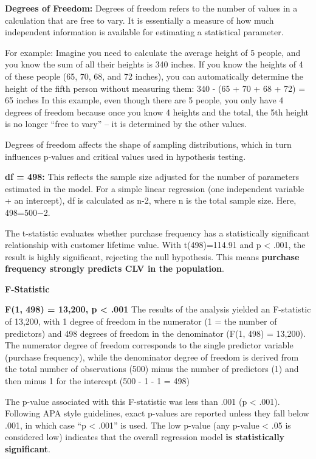 \documentclass[
]{article}
\begin{document}
\textbf{Degrees of Freedom:} Degrees of freedom refers to the number of
values in a calculation that are free to vary. It is essentially a
measure of how much independent information is available for estimating
a statistical parameter.

For example: Imagine you need to calculate the average height of 5
people, and you know the sum of all their heights is 340 inches. If you
know the heights of 4 of these people (65, 70, 68, and 72 inches), you
can automatically determine the height of the fifth person without
measuring them: 340 - (65 + 70 + 68 + 72) = 65 inches In this example,
even though there are 5 people, you only have 4 degrees of freedom
because once you know 4 heights and the total, the 5th height is no
longer ``free to vary'' -- it is determined by the other values.

Degrees of freedom affects the shape of sampling distributions, which in
turn influences p-values and critical values used in hypothesis testing.

\textbf{df = 498:} This reflects the sample size adjusted for the number
of parameters estimated in the model. For a simple linear regression
(one independent variable + an intercept), df is calculated as n-2,
where n is the total sample size. Here, 498=500−2.

The t-statistic evaluates whether purchase frequency has a statistically
significant relationship with customer lifetime value. With
t(498)=114.91 and p \textless{} .001, the result is highly significant,
rejecting the null hypothesis. This means \textbf{purchase frequency
strongly predicts CLV in the population}.

\textbf{F-Statistic}

\textbf{F(1, 498) = 13,200, p \textless{} .001} The results of the
analysis yielded an F-statistic of 13,200, with 1 degree of freedom in
the numerator (1 = the number of predictors) and 498 degrees of freedom
in the denominator (F(1, 498) = 13,200). The numerator degree of freedom
corresponds to the single predictor variable (purchase frequency), while
the denominator degree of freedom is derived from the total number of
observations (500) minus the number of predictors (1) and then minus 1
for the intercept (500 - 1 - 1 = 498)

The p-value associated with this F-statistic was less than .001 (p
\textless{} .001). Following APA style guidelines, exact p-values are
reported unless they fall below .001, in which case ``p \textless{}
.001'' is used. The low p-value (any p-value \textless{} .05 is
considered low) indicates that the overall regression model \textbf{is
statistically significant}.
\end{document}
